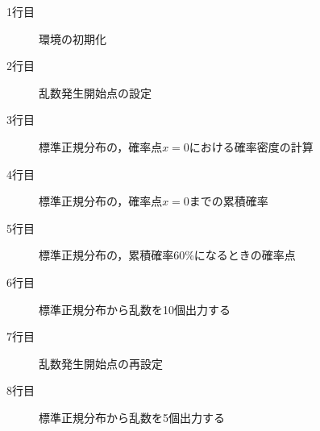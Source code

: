 \begin{description}
	\item[1行目] 環境の初期化
	\item[2行目] 乱数発生開始点の設定
	\item[3行目] 標準正規分布の，確率点$x=0$における確率密度の計算
	\item[4行目] 標準正規分布の，確率点$x=0$までの累積確率
	\item[5行目] 標準正規分布の，累積確率60\%になるときの確率点
	\item[6行目] 標準正規分布から乱数を10個出力する
	\item[7行目] 乱数発生開始点の再設定
	\item[8行目] 標準正規分布から乱数を5個出力する
\end{description}
